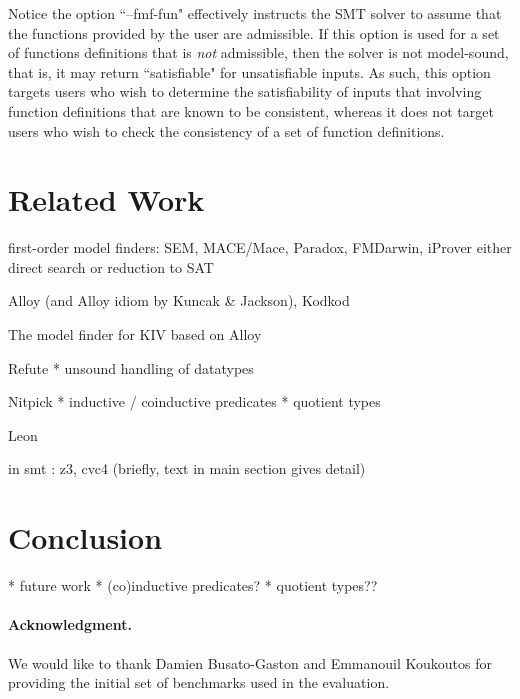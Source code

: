 \documentclass[runningheads,a4paper]{llncs}
\begin{document}
Notice the option ``--fmf-fun" effectively instructs the SMT solver to assume that the functions provided by the user are admissible.
If this option is used for a set of functions definitions that is \emph{not} admissible, then the solver is not model-sound, that is, 
it may return ``satisfiable" for unsatisfiable inputs.
As such,
this option targets users who wish to determine the satisfiability of inputs that involving function definitions that are known to be consistent,
whereas it does not target users who wish to check the consistency of a set of function definitions.


\section{Related Work}

first-order model finders: SEM, MACE/Mace, Paradox, FMDarwin, iProver
  either direct search or reduction to SAT

Alloy (and Alloy idiom by Kuncak \& Jackson), Kodkod

The model finder for KIV based on Alloy

Refute
  * unsound handling of datatypes

Nitpick
  * inductive / coinductive predicates
  * quotient types

Leon

in smt : z3, cvc4 (briefly, text in main section gives detail)


\section{Conclusion}
\label{sec:conclusion}

  * future work
    * (co)inductive predicates?
    * quotient types??

{%
\def\ackname{Acknowledgment}
\paragraph{%
\ackname.}
We would like to thank Damien Busato-Gaston and Emmanouil Koukoutos for
providing the initial set of benchmarks used in the evaluation.
}



{


}
\end{document}
